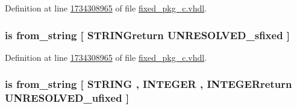 Definition at line \hyperlink{fixed__pkg__c_8vhdl_source_l1734308965}{1734308965} of file \hyperlink{fixed__pkg__c_8vhdl_source}{fixed\+\_\+pkg\+\_\+c.\+vhdl}.

\hypertarget{classfixed__pkg_a8a1b689470218e049c41d22ea4354e26}{}
\subsubsection[{from\+\_\+binary\+\_\+string}]{ {\bfseries \textcolor{keywordflow}{is}\textcolor{vhdlchar}{ }\textcolor{vhdlchar}{from\+\_\+string}\textcolor{vhdlchar}{ }\textcolor{vhdlchar}{\mbox{[}}\textcolor{vhdlchar}{ }\textcolor{vhdlchar}{S\+T\+R\+I\+N\+Greturn}\textcolor{vhdlchar}{ }{\bfseries {\bf U\+N\+R\+E\+S\+O\+L\+V\+E\+D\+\_\+sfixed}} \textcolor{vhdlchar}{ }\textcolor{vhdlchar}{\mbox{]}}\textcolor{vhdlchar}{ }} \hspace{0.3cm}{\ttfamily [Alias]}}\label{classfixed__pkg_a8a1b689470218e049c41d22ea4354e26}


Definition at line \hyperlink{fixed__pkg__c_8vhdl_source_l1734308965}{1734308965} of file \hyperlink{fixed__pkg__c_8vhdl_source}{fixed\+\_\+pkg\+\_\+c.\+vhdl}.

\hypertarget{classfixed__pkg_a7eb54bde4b5dd58cbf3cdff96c651c5a}{}
\subsubsection[{from\+\_\+binary\+\_\+string}]{ {\bfseries \textcolor{keywordflow}{is}\textcolor{vhdlchar}{ }\textcolor{vhdlchar}{from\+\_\+string}\textcolor{vhdlchar}{ }\textcolor{vhdlchar}{\mbox{[}}\textcolor{vhdlchar}{ }\textcolor{comment}{S\+T\+R\+I\+N\+G}\textcolor{vhdlchar}{ }\textcolor{vhdlchar}{,}\textcolor{vhdlchar}{ }\textcolor{comment}{I\+N\+T\+E\+G\+E\+R}\textcolor{vhdlchar}{ }\textcolor{vhdlchar}{,}\textcolor{vhdlchar}{ }\textcolor{vhdlchar}{I\+N\+T\+E\+G\+E\+Rreturn}\textcolor{vhdlchar}{ }{\bfseries {\bf U\+N\+R\+E\+S\+O\+L\+V\+E\+D\+\_\+ufixed}} \textcolor{vhdlchar}{ }\textcolor{vhdlchar}{\mbox{]}}\textcolor{vhdlchar}{ }} \hspace{0.3cm}{\ttfamily [Alias]}}\label{classfixed__pkg_a7eb54bde4b5dd58cbf3cdff96c651c5a}


